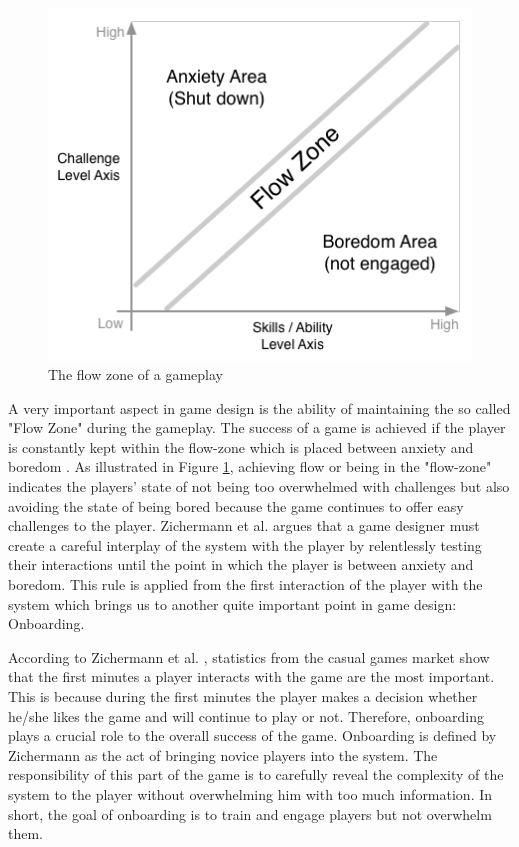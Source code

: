 \newpage
\begin{figure}[]
  \includegraphics[width=.8\linewidth]{figures/experiment2/flowzone.png}
  \caption{The flow zone of a gameplay \cite{49}}
  \label{fig:flowzone}
\end{figure}
A very important aspect in game design is the ability of maintaining the so called "Flow Zone" during the gameplay. The success of a game is achieved if the player is constantly kept within the flow-zone which is placed between anxiety and boredom \cite{49}. As illustrated in Figure \ref{fig:flowzone}, achieving flow or being in the "flow-zone" indicates the players' state of not being too overwhelmed with challenges but also avoiding the state of being bored because the game continues to offer easy challenges to the player. Zichermann et al. \cite{48} argues that a game designer must create a careful interplay of the system with the player by relentlessly testing their interactions until the point in which the player is between anxiety and boredom. This rule is applied from the first interaction of the player with the system which brings us to another quite important point in game design: Onboarding. 

According to Zichermann et al. \cite{48}, statistics from the casual games market show that the first minutes a player interacts with the game are the most important. This is because during the first minutes the player makes a decision whether he/she likes the game and will continue to play or not. Therefore, onboarding plays a crucial role to the overall success of the game. Onboarding is defined by Zichermann as the act of bringing novice players into the system. The responsibility of this part of the game is to carefully reveal the complexity of the system to the player without overwhelming him with too much information. In short, the goal of onboarding is to train and engage players but not overwhelm them.

